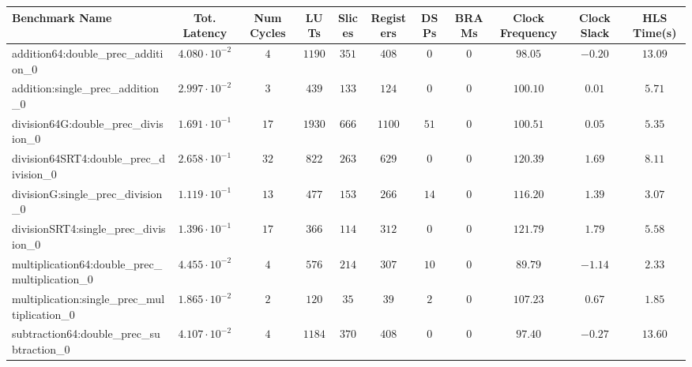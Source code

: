 \begin{tabular}{|l|c|c|c|c|c|c|c|c|c|c|}
\hline
Benchmark Name                                   & Tot. Latency            & Num Cycles & LUTs     & Slices   & Registers & DSPs   & BRAMs & Clock Frequency & Clock Slack & HLS Time(s) \\
\hline
addition64:double\_prec\_addition\_0             & $ 4.080 \cdot 10^{-2} $ & $ 4      $ & $ 1190 $ & $ 351  $ & $ 408   $ & $ 0  $ & $ 0 $ & $ 98.05       $ & $ -0.20   $ & $ 13.09   $ \\
addition:single\_prec\_addition\_0               & $ 2.997 \cdot 10^{-2} $ & $ 3      $ & $ 439  $ & $ 133  $ & $ 124   $ & $ 0  $ & $ 0 $ & $ 100.10      $ & $ 0.01    $ & $ 5.71    $ \\
division64G:double\_prec\_division\_0            & $ 1.691 \cdot 10^{-1} $ & $ 17     $ & $ 1930 $ & $ 666  $ & $ 1100  $ & $ 51 $ & $ 0 $ & $ 100.51      $ & $ 0.05    $ & $ 5.35    $ \\
division64SRT4:double\_prec\_division\_0         & $ 2.658 \cdot 10^{-1} $ & $ 32     $ & $ 822  $ & $ 263  $ & $ 629   $ & $ 0  $ & $ 0 $ & $ 120.39      $ & $ 1.69    $ & $ 8.11    $ \\
divisionG:single\_prec\_division\_0              & $ 1.119 \cdot 10^{-1} $ & $ 13     $ & $ 477  $ & $ 153  $ & $ 266   $ & $ 14 $ & $ 0 $ & $ 116.20      $ & $ 1.39    $ & $ 3.07    $ \\
divisionSRT4:single\_prec\_division\_0           & $ 1.396 \cdot 10^{-1} $ & $ 17     $ & $ 366  $ & $ 114  $ & $ 312   $ & $ 0  $ & $ 0 $ & $ 121.79      $ & $ 1.79    $ & $ 5.58    $ \\
multiplication64:double\_prec\_multiplication\_0 & $ 4.455 \cdot 10^{-2} $ & $ 4      $ & $ 576  $ & $ 214  $ & $ 307   $ & $ 10 $ & $ 0 $ & $ 89.79       $ & $ -1.14   $ & $ 2.33    $ \\
multiplication:single\_prec\_multiplication\_0   & $ 1.865 \cdot 10^{-2} $ & $ 2      $ & $ 120  $ & $ 35   $ & $ 39    $ & $ 2  $ & $ 0 $ & $ 107.23      $ & $ 0.67    $ & $ 1.85    $ \\
subtraction64:double\_prec\_subtraction\_0       & $ 4.107 \cdot 10^{-2} $ & $ 4      $ & $ 1184 $ & $ 370  $ & $ 408   $ & $ 0  $ & $ 0 $ & $ 97.40       $ & $ -0.27   $ & $ 13.60   $ \\

\end{tabular}
